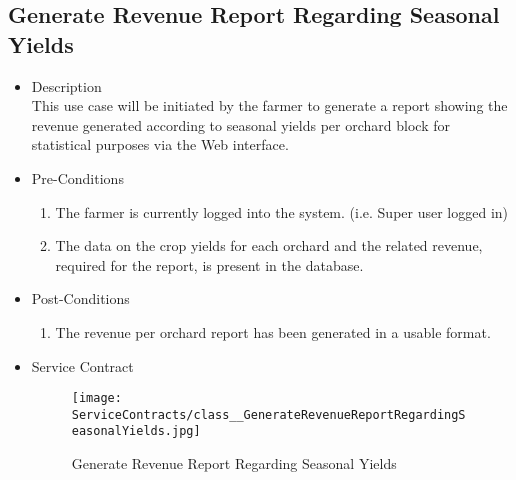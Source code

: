 \documentclass[11pt,fleqn]{book} %
\begin{document}
\subsection{Generate Revenue Report Regarding Seasonal Yields}
\begin{itemize}
	\item Description\\
	This use case will be initiated by the farmer to generate a report showing the revenue generated according to seasonal yields per orchard block for statistical purposes via the Web interface.
	\item Pre-Conditions
	\begin{enumerate}
		\item The farmer is currently logged into the system. (i.e. Super user logged in)
		\item The data on the crop yields for each orchard and the related revenue, required for the report, is present in the database.	
	\end{enumerate}
	\item Post-Conditions
	\begin{enumerate}
		\item The revenue per orchard report has been generated in a usable format.
	\end{enumerate}
	\item Service Contract
	\begin{figure}
		\texttt{[image: ServiceContracts/class\_\_GenerateRevenueReportRegardingSeasonalYields.jpg]}
		\caption{Generate Revenue Report Regarding Seasonal Yields}
	\end{figure}
\end{itemize}
\end{document}
